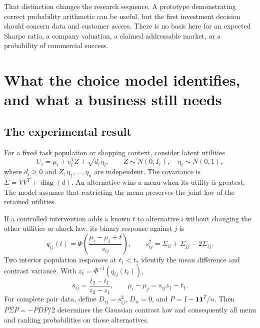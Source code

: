 \documentclass[11pt]{article}
\newcommand{\one}{\mathbf 1}
\newcommand{\diag}{\operatorname{diag}}
\theoremstyle{remark}\newtheorem{example}{Example}
\begin{document}
That distinction changes the research sequence. A prototype demonstrating
correct probability arithmetic can be useful, but the first investment decision
should concern data and customer access. There is no basis here for an expected
Sharpe ratio, a company valuation, a claimed addressable market, or a probability
of commercial success.

\section{What the choice model identifies, and what a business still needs}
\subsection{The experimental result}
For a fixed task population or shopping context, consider latent utilities
\begin{equation}\label{eq:rum}
 U_i=\mu_i+v_i^TZ+\sqrt{d_i}\eta_i,\qquad
 Z\sim N(0,I_r),\quad \eta_i\sim N(0,1),
\end{equation}
where $d_i\geq0$ and $Z,\eta_1,\ldots,\eta_n$ are independent.
The covariance is $\Sigma=VV^T+\diag(d)$. An alternative wins a menu when its
utility is greatest. The model assumes that restricting the menu preserves the
joint law of the retained utilities.

If a controlled intervention adds a known $t$ to alternative $i$ without changing
the other utilities or shock law, its binary response against $j$ is
\begin{equation}\label{eq:probit}
 q_{ij}(t)=\Phi\left(\frac{\mu_i-\mu_j+t}{s_{ij}}\right),\qquad
 s_{ij}^2=\Sigma_{ii}+\Sigma_{jj}-2\Sigma_{ij}.
\end{equation}
Two interior population responses at $t_1<t_2$ identify the mean difference and
contrast variance. With $z_\ell=\Phi^{-1}(q_{ij}(t_\ell))$,
\begin{equation}
 s_{ij}=\frac{t_2-t_1}{z_2-z_1},\qquad
 \mu_i-\mu_j=s_{ij}z_1-t_1.
\end{equation}
For complete pair data, define $D_{ij}=s_{ij}^2$, $D_{ii}=0$, and
$P=I-\one\one^T/n$. Then $P\Sigma P=-PDP/2$ determines the Gaussian contrast
law and consequently all menu and ranking probabilities on those alternatives.
\end{document}
